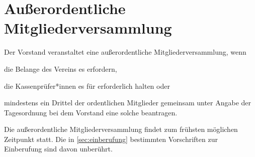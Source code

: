 \section{Außerordentliche Mitgliederversammlung}
\begin{absätze}
    \item Der Vorstand veranstaltet eine außerordentliche Mitgliederversammlung, wenn
    \begin{sätze}
        \item die Belange des Vereins es erfordern,
        \item die Kassenprüfer*innen es für erforderlich halten oder
        \item mindestens ein Drittel der ordentlichen Mitglieder gemeinsam unter Angabe der Tagesordnung bei dem Vorstand eine solche beantragen.
	\end{sätze}
\item Die außerordentliche Mitgliederversammlung findet zum frühsten möglichen Zeitpunkt statt. Die in \ref{sec:einberufung} bestimmten Vorschriften zur Einberufung sind davon unberührt.
\end{absätze}
